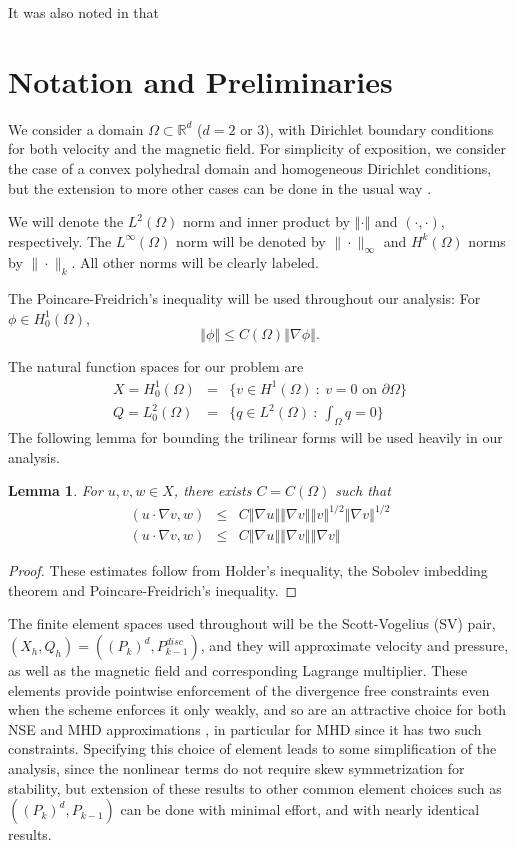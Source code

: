 \documentclass[11pt]{article}%
\numberwithin{equation}{section}
\newcommand{\norm}[1]{\left\Vert#1\right\Vert}
\newtheorem{lem}{Lemma}[section]
\newcommand{\Real}{\mathbb{R}}
\begin{document}
It was also noted in \cite{Cao_Lunasin_Titi_2006} that 

\section{Notation and Preliminaries}

We consider a domain $\Omega\subset\Real^d$ ($d=2$ or $3$), with Dirichlet boundary conditions for both velocity and the magnetic field.  For simplicity of exposition, we consider the case of a convex polyhedral domain and homogeneous Dirichlet conditions, but the extension to more other cases can be done in the usual way \cite{TEM79}.  

We will denote the $L^2(\Omega)$ norm and inner product by $\norm{\cdot}$ and $(\cdot,\cdot)$, respectively.  The $L^{\infty}(\Omega)$ norm will be denoted by $\| \cdot \|_{\infty}$ and $H^k(\Omega)$ norms by $\| \cdot \|_k$.  All other norms will 
be clearly labeled.

The Poincare-Freidrich's inequality will be used throughout our analysis: For $\phi\in H^{1}_{0}(\Omega)$,
\[
\norm{\phi} \le C(\Omega) \norm{\nabla \phi}.
\]

The natural function spaces for our problem are
\begin{eqnarray*}
X = H^1_0(\Omega) & = & \{ v \in H^{1}(\Omega)\ : \ v=0 \mbox{ on } \partial\Omega\} \\
Q = L^2_0(\Omega) & = & \{ q \in L^{2}(\Omega)\ : \ \int_{\Omega} q=0 \}
\end{eqnarray*}
The following lemma for bounding the trilinear forms will be used heavily in our analysis.
\begin{lem} \label{trilinear}
For $u,v,w\in X$, there exists $C=C(\Omega)$ such that
\begin{eqnarray}
(u \cdot \nabla v,w) & \le & C\norm{\nabla u}\norm{\nabla v}\norm{v}^{1/2}\norm{\nabla v}^{1/2} \\
(u \cdot \nabla v,w) & \le & C\norm{\nabla u}\norm{\nabla v}\norm{\nabla v}
\end{eqnarray}
\end{lem}
\begin{proof}
These estimates follow from Holder's inequality, the Sobolev imbedding theorem and Poincare-Freidrich's inequality.
\end{proof}

The finite element spaces used throughout will be the Scott-Vogelius (SV) pair, $(X_h,Q_h)=((P_{k})^d,P_{k-1}^{disc})$, and they
will approximate velocity and pressure, as well as the magnetic field and corresponding Lagrange multiplier.  These elements provide pointwise enforcement of the divergence free constraints even when the scheme enforces it only weakly, and so are an attractive choice for both NSE and MHD approximations \cite{CELR10, CLRW10, linke09}, in particular for MHD since it has two such constraints.  Specifying this choice of element leads to some simplification of the analysis, since the nonlinear terms do not require skew symmetrization for stability, but extension of these results to other common element choices such as $((P_k)^d,P_{k-1})$ can be done with minimal effort, and with nearly identical results.
\end{document}
